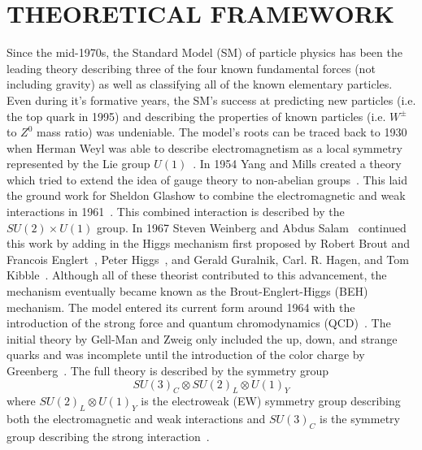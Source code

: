 %
%
%


\chapter{\uppercase {Theoretical Framework}}
\label{ch:theoretical_framework}

Since the mid-1970s, the Standard Model (SM) of particle physics has been the leading theory describing three of the four known fundamental forces (not including gravity) as well as classifying all of the known elementary particles.
Even during it's formative years, the SM's success at predicting new particles (i.e. the top quark in 1995) and describing the properties of known particles (i.e. $W^{\pm}$ to $Z^{0}$ mass ratio) was undeniable.
The model's roots can be traced back to 1930 when Herman Weyl was able to describe electromagnetism as a local symmetry represented by the Lie group $U\left(1\right)$~\cite{Weyl1929}.
In 1954 Yang and Mills created a theory which tried to extend the idea of gauge theory to non-abelian groups~\cite{PhysRev.96.191}.
This laid the ground work for Sheldon Glashow to combine the electromagnetic and weak interactions in 1961~\cite{GLASHOW1961579}.
This combined interaction is described by the $SU\left(2\right){\times}U\left(1\right)$ group.
In 1967 Steven Weinberg and Abdus Salam~\cite{PhysRevLett.19.1264,salam1968} continued this work by adding in the Higgs mechanism first proposed by Robert Brout and Francois Englert~\cite{PhysRevLett.13.321}, Peter Higgs~\cite{PhysRevLett.13.508,Higgs:1966ev}, and Gerald Guralnik, Carl. R. Hagen, and Tom Kibble~\cite{PhysRevLett.13.585,Kibble:1967sv}.
Although all of these theorist contributed to this advancement, the mechanism eventually became known as the Brout-Englert-Higgs (BEH) mechanism.
The model entered its current form around 1964 with the introduction of the strong force and quantum chromodynamics (QCD)~\cite{Neeman:1961jhl,GellMann:1962xb,GellMann:1964nj,Zweig:1981pd,Fritzsch:1972jv}.
The initial theory by Gell-Man and Zweig only included the up, down, and strange quarks and was incomplete until the introduction of the color charge by Greenberg~\cite{PhysRevLett.13.598}.
The full theory is described by the symmetry group
\begin{equation}\label{eq:standard_model_symmetry_group}
SU\left(3\right)_{C}{\otimes}SU\left(2\right)_{L}{\otimes}U\left(1\right)_{Y}
\end{equation}
where $SU\left(2\right)_{L}{\otimes}U\left(1\right)_{Y}$ is the electroweak (EW) symmetry group describing both the electromagnetic and weak interactions and $SU\left(3\right)_{C}$ is the symmetry group describing the strong interaction~\cite{Burgess2007,Aitchison2012}.

